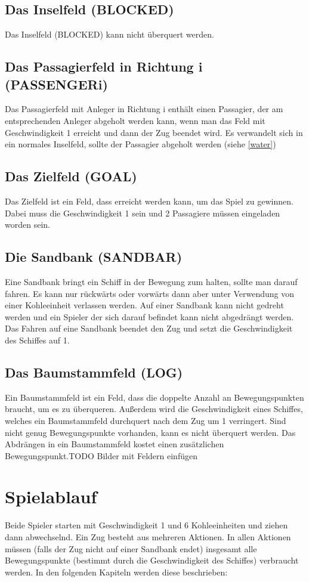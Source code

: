 \documentclass[12pt,a4paper, ngerman, oneside]{scrartcl}
\begin{document}
\subsection{\label{water}Das Inselfeld (BLOCKED)}
Das Inselfeld (BLOCKED) kann nicht überquert werden.
\subsection{Das Passagierfeld in Richtung i (PASSENGERi)}
Das Passagierfeld mit Anleger in Richtung i enthält einen Passagier, der am entsprechenden Anleger abgeholt werden kann, wenn man das Feld mit Geschwindigkeit 1 erreicht und dann der Zug beendet wird. Es verwandelt sich in ein normales Inselfeld, sollte der Passagier abgeholt werden (siehe \ref{water})
\subsection{Das Zielfeld (GOAL)}
Das Zielfeld ist ein Feld, dass erreicht werden kann, um das Spiel zu gewinnen. Dabei muss die Geschwindigkeit 1 sein und 2 Passagiere müssen eingeladen worden sein.
\subsection{Die Sandbank (SANDBAR)}
Eine Sandbank bringt ein Schiff in der Bewegung zum halten, sollte man darauf fahren. Es kann nur rückwärts oder vorwärts dann aber unter Verwendung von einer Kohleeinheit verlassen werden. Auf einer Sandbank kann nicht gedreht werden und ein Spieler der sich darauf befindet kann nicht abgedrängt werden. Das Fahren auf eine Sandbank beendet den Zug und setzt die Geschwindigkeit des Schiffes auf 1.
\subsection{Das Baumstammfeld (LOG)}
Ein Baumstammfeld ist ein Feld, dass die doppelte Anzahl an Bewegungspunkten braucht, um es zu überqueren.
Außerdem wird die Geschwindigkeit eines Schiffes, welches ein Baumstammfeld durchquert nach dem Zug um 1 verringert. Sind nicht genug Bewegungspunkte vorhanden, kann es nicht überquert werden. Das Abdrängen in ein Baumstammfeld kostet einen zusätzlichen Bewegungspunkt.TODO Bilder mit Feldern einfügen

\section{Spielablauf}
Beide Spieler starten mit Geschwindigkeit 1 und 6 Kohleeinheiten und ziehen dann abwechselnd. Ein Zug besteht aus mehreren Aktionen. In allen Aktionen müssen (falls der Zug nicht auf einer Sandbank endet) insgesamt alle Bewegungspunkte (bestimmt durch die Geschwindigkeit des Schiffes) verbraucht werden. In den folgenden Kapiteln werden diese beschrieben:
\end{document}
